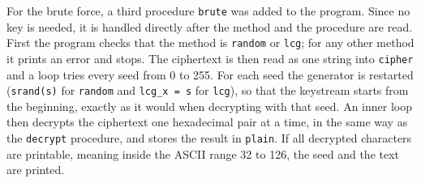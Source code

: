 \documentclass[a4paper,10pt]{article}
\begin{document}
For the brute force, a third procedure {\tt brute} was added to the program. Since no key is needed, it is handled directly after the method and the procedure are read. First the program checks that the method is {\tt random} or {\tt lcg}; for any other method it prints an error and stops. The ciphertext is then read as one string into {\tt cipher} and a loop tries every seed from 0 to 255. For each seed the generator is restarted ({\tt srand(s)} for {\tt random} and {\tt lcg\_x = s} for {\tt lcg}), so that the keystream starts from the beginning, exactly as it would when decrypting with that seed. An inner loop then decrypts the ciphertext one hexadecimal pair at a time, in the same way as the {\tt decrypt} procedure, and stores the result in {\tt plain}. If all decrypted characters are printable, meaning inside the ASCII range 32 to 126, the seed and the text are printed.
 
\end{document}
